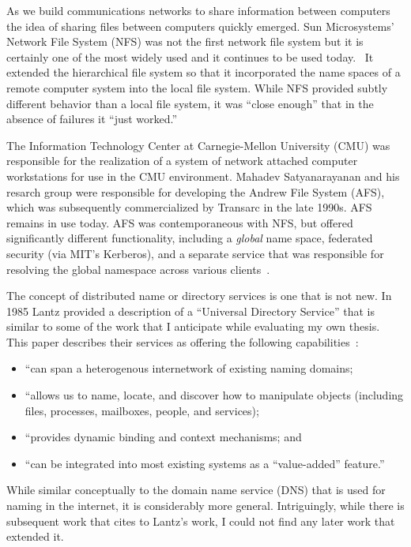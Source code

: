 
As we build communications networks to share information between computers the
idea of sharing files between computers quickly emerged.  Sun Microsystems'
Network File System (NFS) was not the first network file system but it is
certainly one of the most widely used and it continues to be used
today.~\cite{nfs}  It extended the hierarchical file system so that it
incorporated the name spaces of a remote computer system into the local file
system. While NFS provided subtly different behavior than a local file system,
it was ``close enough'' that in the absence of failures it ``just worked.''


The Information Technology Center at Carnegie-Mellon University (CMU) was responsible
for the realization of a system of network attached computer workstations for
use in the CMU environment. Mahadev Satyanarayanan and his resarch group were
responsible for developing the Andrew File System (AFS), which was subsequently
commercialized by Transarc in the late 1990s.  AFS remains in use today.  AFS
was contemporaneous with NFS, but offered significantly different functionality,
including a \emph{global} name space, federated security (via MIT's Kerberos),
and a separate service that was responsible for resolving the global namespace
across various clients~\cite{howard1988scale}.


The concept of distributed name or directory services is one that is not new.
In 1985 Lantz provided a description of a ``Universal Directory Service'' that
is similar to some of the work that I anticipate while evaluating my own thesis.
This paper describes their services as offering the following
capabilities~\cite{10.1145/12481.12483}:
\begin{itemize}
    \item ``can span a heterogenous internetwork of existing naming domains;
    \item ``allows us to name, locate, and discover how to manipulate objects
          (including files, processes, mailboxes, people, and services);
    \item ``provides dynamic binding and context mechanisms; and
    \item ``can be integrated into most existing systems as a ``value-added''
          feature.''
\end{itemize}

While similar conceptually to the domain name service (DNS) that is used for
naming in the internet, it is considerably more general.  Intriguingly, while
there is subsequent work that cites to Lantz's work, I could
not find any later work that extended it.

